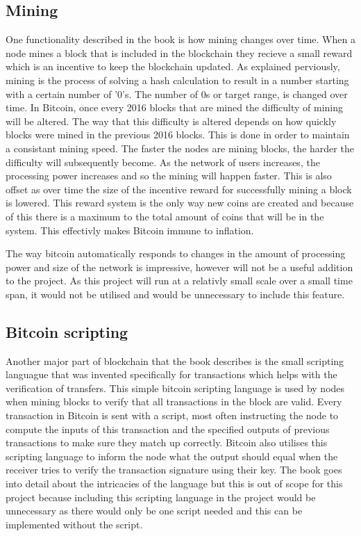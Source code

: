 \documentclass{l4proj}
\begin{document}
\subsection{Mining}
One functionality described in the book is how mining changes over time. When a node mines a block that is included in the
blockchain they recieve a small reward which is an incentive to keep the blockchain updated. As explained perviously,
mining is the process of solving a hash calculation to result in a number starting with a certain number of '0's. The number
of 0s or target range, is changed over time. In Bitcoin, once every 2016 blocks that are mined the difficulty of mining will be
altered. The way that this difficulty is altered depends on how quickly blocks were mined in the previous 2016 blocks. This
is done in order to maintain a consistant mining speed. The faster the nodes are mining blocks, the harder the difficulty
will subsequently become. As the network of users increases, the processing power increases and so the mining will happen
faster. This is also offset as over time the size of the incentive reward for successfully mining a block is lowered.
This reward system is the only way new coins are created and because of this there is a maximum to the total amount of coins
that will be in the system. This effectivly makes Bitcoin immune to inflation.

The way bitcoin automatically responds to changes in the amount of processing power and size of the network is impressive,
however will not be a useful addition to the project. As this project will run at a relativly small scale over a small
time span, it would not be utilised and would be unnecessary to include this feature.

\subsection{Bitcoin scripting}
Another major part of blockchain that the book describes is the small scripting languague that was invented specifically for
transactions which helps with the verification of transfers. This simple bitcoin scripting language is used
by nodes when mining blocks to verify that all transactions in the block are valid. Every transaction in Bitcoin is
sent with a script, most often instructing the node to compute the inputs of this transaction and the specified outputs of
previous transactions to make sure they match up correctly. Bitcoin also utilises this scripting language to inform the node
what the output should equal when the receiver tries to verify the transaction signature using their key. The book goes
into detail about the intricacies of the language but this is out of scope for this project because including this scripting language
in the project would be unnecessary as there would only be one script needed and this can be implemented without the script.
\end{document}
